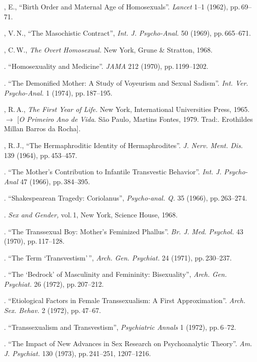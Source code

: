 \begin{description}
{, E., ``Birth Order and Maternal Age of
Homosexuals''. \textit{Lancet } 1--1 (1962), pp.\,69--71.

, V.\,N., ``The Masochistic Contract'',
\textit{Int. J. Psycho-Anal. }50 (1969), pp.\,665--671.

, C.\,W., \textit{The Overt Homosexual. }New York, Grune \& Stratton,
1968.

. ``Homosexuality and Medicine''.
\textit{JAMA }212 (1970), pp.\,1199--1202.

. ``The Demonified Mother: A Study of Voyeurism
and Sexual Sadism''. \textit{Int. Ver. Psycho-Anal. }1 (1974), pp.\,187--195.

, R.\,A., \textit{The First Year of Life. }New York, International
Universities Press, 1965. {$\bm{\rightarrow}$} [\textit{O Primeiro Ano de Vida}. São Paulo\textit{, }
Martins Fontes, 1979. Trad:. Erothildes Millan Barros da Rocha].

, R.\,J., ``The Hermaphroditic Identity of
Hermaphrodites''. \textit{J. Nerv. Ment. Dis. }139 (1964), pp.\,453--457.

. ``The Mother's Contribution to
Infantile Transvestic Behavior''. \textit{Int. J. Psycho-Anal } 47
(1966), pp.\,384--395.

. ``Shakespearean Tragedy:
Coriolanus'', \textit{Psycho-anal. Q. }35 (1966), pp.\,263--274.

. \textit{Sex and Gender, }vol.\,1, New York, Science House,
1968.

. ``The Transsexual Boy:
Mother's Feminized Phallus''. \textit{Br. J. Med.
Psychol. }43 (1970), pp.\,117--128.

. ``The Term `Transvestism'\,'', \textit{Arch.
Gen. Psychiat. }24 (1971), pp.\,230--237.

. ``The `Bedrock' of Masculinity and Femininity:
Bisexuality'', \textit{Arch. Gen. Psychiat. }26 (1972), pp.\,207--212.

. ``Etiological Factors in Female Transsexualism:
A First Approximation''. \textit{Arch. Sex. Behav. }2 (1972), pp.\,47--67.

. ``Transsexualism and
Transvestism'', \textit{Psychiatric Annals }1 (1972), pp.\,6--72.

. ``The Impact of New Advances in Sex Research on
Psychoanalytic Theory''. \textit{Am. J. Psychiat. }130 (1973), pp.\,241--251, 1207--1216.

}
\end{description}
